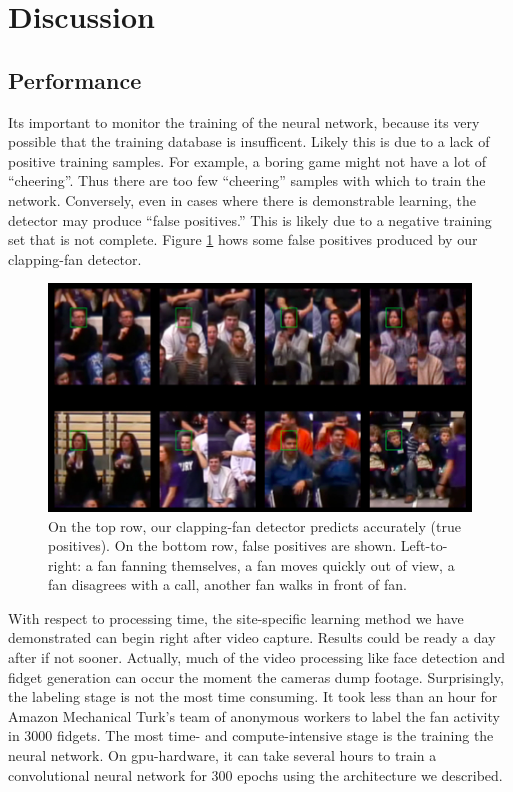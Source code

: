 \documentclass[times, 10pt,twocolumn]{article}
\begin{document}
\section{Discussion}

\subsection{Performance}
\label{sec_perf}

Its important to monitor the training of the neural network, because its very possible that the training database is insufficent.  Likely this is due to a lack of positive training samples.  For example, a boring game might not have a lot of ``cheering''.  Thus there are too few ``cheering'' samples with which to train the network.  Conversely, even in cases where there is demonstrable learning, the detector may produce ``false positives.''  This is likely due to a negative training set that is not complete.  Figure \ref{fig_results} hows some false positives produced by our clapping-fan detector.

\begin{figure}[bt]
\centering
\includegraphics[width=0.96\columnwidth]{results}
\caption{\label{fig_results} \small On the top row, our clapping-fan detector predicts accurately (true positives).  On the bottom row, false positives are shown.  Left-to-right: a fan fanning themselves, a fan moves quickly out of view, a fan disagrees with a call, another fan walks in front of fan.   }
\end{figure}

With respect to processing time, the site-specific learning method we have demonstrated can begin right after video capture. Results could be ready a day after if not sooner.  Actually, much of the video processing like face detection and fidget generation can occur the moment the cameras dump footage.  Surprisingly, the labeling stage is not the most time consuming.  It took less than an hour for Amazon Mechanical Turk's team of anonymous workers to label the fan activity in 3000 fidgets.  The most time- and compute-intensive stage is the training the neural network.  On gpu-hardware, it can take several hours to train a convolutional neural network for 300 epochs using the architecture we described.
\end{document}
